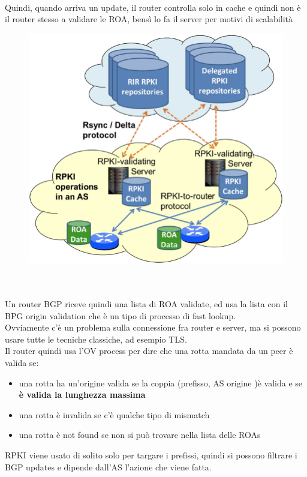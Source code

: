 \documentclass[12pt, oneside]{extbook} %
\begin{document}
\\Quindi, quando arriva un update, il router controlla solo in cache e quindi non è il router stesso a validare le ROA, bensì lo fa il server per motivi di scalabilità\\
\begin{figure}[h!]
    \centering
    \includegraphics[scale=0.5]{../../immagini/rpki_valid}
\end{figure}\\\\
Un router BGP riceve quindi una lista di ROA validate, ed usa la lista con il BPG origin validation che è un tipo di processo di fast lookup.
\\Ovviamente c'è un problema sulla connessione fra router e server, ma si possono usare tutte le tecniche classiche, ad esempio TLS.
\\Il router quindi usa l'OV process per dire che una rotta mandata da un peer è valida se:
\begin{itemize}
	\item una rotta ha un'origine valida se la coppia (prefisso, AS origine )è valida e se \textbf{è valida la lunghezza massima}
	\item una rotta è invalida se c'è qualche tipo di mismatch
	\item una rotta è not found se non si può trovare nella lista delle ROAs
\end{itemize}
RPKI viene usato di solito solo per targare i prefissi, quindi si possono filtrare i BGP updates e dipende dall'AS l'azione che viene fatta.
\end{document}
